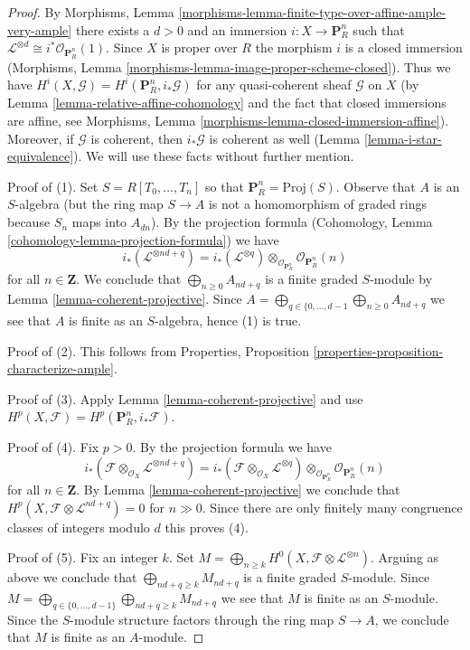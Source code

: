 \documentclass{stacks-project}
\theoremstyle{plain}
\theoremstyle{definition}
\theoremstyle{remark}
\numberwithin{equation}{subsection}
\begin{document}
\begin{proof}
By
Morphisms, Lemma \ref{morphisms-lemma-finite-type-over-affine-ample-very-ample}
there exists a $d > 0$ and an immersion $i : X \to \mathbf{P}^n_R$
such that $\mathcal{L}^{\otimes d} \cong i^*\mathcal{O}_{\mathbf{P}^n_R}(1)$.
Since $X$ is proper over $R$ the morphism $i$ is a closed immersion
(Morphisms, Lemma \ref{morphisms-lemma-image-proper-scheme-closed}).
Thus we have $H^i(X, \mathcal{G}) = H^i(\mathbf{P}^n_R, i_*\mathcal{G})$
for any quasi-coherent sheaf $\mathcal{G}$ on $X$
(by Lemma \ref{lemma-relative-affine-cohomology} and the fact that
closed immersions are affine, see
Morphisms, Lemma \ref{morphisms-lemma-closed-immersion-affine}).
Moreover, if $\mathcal{G}$ is coherent, then $i_*\mathcal{G}$
is coherent as well (Lemma \ref{lemma-i-star-equivalence}).
We will use these facts without further mention.

\medskip\noindent
Proof of (1). Set $S = R[T_0, \ldots, T_n]$ so that
$\mathbf{P}^n_R = \text{Proj}(S)$.
Observe that $A$ is an $S$-algebra (but the ring map $S \to A$ is not
a homomorphism of graded rings because $S_n$ maps into $A_{dn}$).
By the projection formula
(Cohomology, Lemma \ref{cohomology-lemma-projection-formula})
we have
$$
i_*(\mathcal{L}^{\otimes nd + q}) =
i_*(\mathcal{L}^{\otimes q})
\otimes_{\mathcal{O}_{\mathbf{P}^n_R}}
\mathcal{O}_{\mathbf{P}^n_R}(n)
$$
for all $n \in \mathbf{Z}$. We conclude that $\bigoplus_{n \geq 0} A_{nd + q}$
is a finite graded $S$-module by Lemma \ref{lemma-coherent-projective}.
Since
$A = \bigoplus_{q \in \{0, \ldots, d - 1} \bigoplus_{n \geq 0} A_{nd + q}$
we see that $A$ is finite as an $S$-algebra, hence (1) is true.

\medskip\noindent
Proof of (2). This follows from
Properties, Proposition \ref{properties-proposition-characterize-ample}.

\medskip\noindent
Proof of (3). Apply Lemma \ref{lemma-coherent-projective}
and use $H^p(X, \mathcal{F}) = H^p(\mathbf{P}^n_R, i_*\mathcal{F})$.

\medskip\noindent
Proof of (4). Fix $p > 0$. By the projection formula we have
$$
i_*(\mathcal{F} \otimes_{\mathcal{O}_X} \mathcal{L}^{\otimes nd + q}) =
i_*(\mathcal{F} \otimes_{\mathcal{O}_X} \mathcal{L}^{\otimes q})
\otimes_{\mathcal{O}_{\mathbf{P}^n_R}}
\mathcal{O}_{\mathbf{P}^n_R}(n)
$$
for all $n \in \mathbf{Z}$. By Lemma \ref{lemma-coherent-projective}
we conclude that $H^p(X, \mathcal{F} \otimes \mathcal{L}^{nd + q}) = 0$
for $n \gg 0$. Since there are only finitely many congruence classes
of integers modulo $d$ this proves (4).

\medskip\noindent
Proof of (5). Fix an integer $k$. Set
$M = \bigoplus_{n \geq k} H^0(X, \mathcal{F} \otimes \mathcal{L}^{\otimes n})$.
Arguing as above we conclude that $\bigoplus_{nd + q \geq k} M_{nd + q}$
is a finite graded $S$-module. Since
$M = \bigoplus_{q \in \{0, \ldots, d - 1\}}
\bigoplus_{nd + q \geq k} M_{nd + q}$
we see that $M$ is finite as an $S$-module. Since the $S$-module structure
factors through the ring map $S \to A$, we conclude that $M$ is finite
as an $A$-module.
\end{proof}
\end{document}
